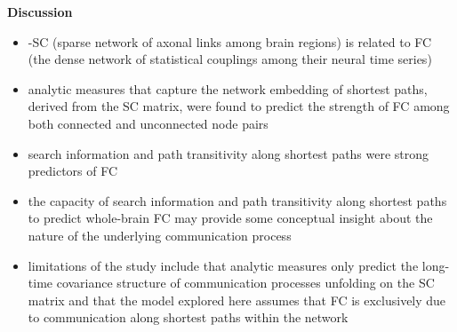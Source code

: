 \documentclass[11pt, letterpaper]{article}
\begin{document}
\noindent\textbf{Discussion}
\begin{itemize}
    \setlength\itemsep{0.05em}
    
    \item -SC (sparse network of axonal links among brain regions) is related to FC (the dense network of statistical couplings among their neural time series)
    \item analytic measures that capture the network embedding of shortest paths, derived from the SC matrix, were found to predict the strength of FC among both connected and unconnected node pairs
    \item search information and path transitivity along shortest paths were strong predictors of FC
    \item the capacity of search information and path transitivity along shortest paths to predict whole-brain FC may provide some conceptual insight about the nature of the underlying communication process
    \item limitations of the study include that analytic measures only predict the long-time covariance structure of communication processes unfolding on the SC matrix and that the model explored here assumes that FC is exclusively due to communication along shortest paths within the network
\end{itemize}
\end{document}
